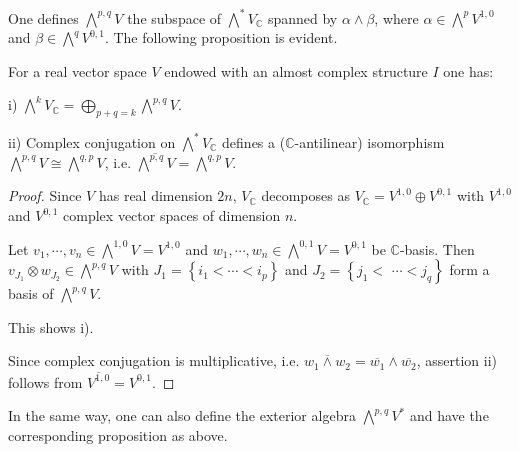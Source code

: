 \documentclass{ctexart}
\begin{document}
One defines $\bigwedge^{p, q} V$ the subspace of $\bigwedge^* V_\mathbb{C}$ spanned by $\alpha\wedge\beta$,
where $\alpha\in\bigwedge^p V^{1,0}$ and $\beta\in\bigwedge^q V^{0,1}$. The following proposition is evident. 
\begin{proposition}
  For a real vector space $V$ endowed with an almost complex structure $I$ one has:
  
  i) $\bigwedge^{k} V_{\mathbb{C}}=\bigoplus_{p+q=k} \bigwedge^{p, q} V$.

  ii) Complex conjugation on $\bigwedge^{*} V_{\mathbb{C}}$ defines a ($\mathbb{C}$-antilinear) isomorphism $\bigwedge^{p, q} V \cong \bigwedge^{q, p} V$, 
  i.e. $\overline{\bigwedge^{p, q} V}=\bigwedge^{q, p} V$.
\end{proposition}
\begin{proof}[Proof]
  Since $V$ has real dimension $2n$, $V_{\mathbb{C}}$ decomposes as $V_{\mathbb{C}}=V^{1,0} \oplus V^{0,1}$ with $V^{1,0}$ and $V^{0,1}$ complex vector spaces of dimension $n$. 

  Let $v_{1}, \cdots, v_{n} \in \bigwedge^{1,0} V=V^{1,0}$ and $w_{1}, \cdots, w_{n} \in \bigwedge^{0,1} V=V^{0,1}$ be $\mathbb{C}$-basis. Then $v_{J_{1}} \otimes w_{J_{2}} \in \bigwedge^{p, q} V$ with 
  $J_{1}=\left\{i_{1}<\cdots<i_{p}\right\}$ and $J_{2}=\left\{j_{1}<\right.$ $\left.\cdots<j_{q}\right\}$ form a basis of $\bigwedge^{p, q} V$.

  This shows i). 

  Since complex conjugation is multiplicative, i.e. $\overline{w_{1} \wedge w_{2}}=\overline{w_{1}} \wedge \overline{w_{2}}$, assertion ii) follows from $\overline{V^{1,0}}=V^{0,1}$. 
\end{proof}

In the same way, one can also define the exterior algebra $\bigwedge^{p, q} V^*$ and have the corresponding proposition as above. 
\end{document}
